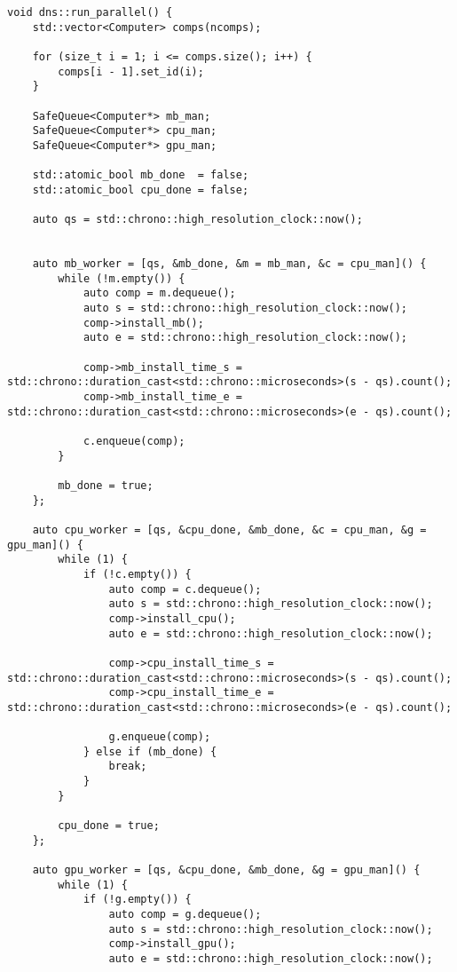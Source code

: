 \begin{lstlisting}[caption=Работа конвейеров, label=list:conveyor, language={}]
void dns::run_parallel() {
    std::vector<Computer> comps(ncomps);

    for (size_t i = 1; i <= comps.size(); i++) {
        comps[i - 1].set_id(i);
    }

    SafeQueue<Computer*> mb_man;
    SafeQueue<Computer*> cpu_man;
    SafeQueue<Computer*> gpu_man;

    std::atomic_bool mb_done  = false;
    std::atomic_bool cpu_done = false;

    auto qs = std::chrono::high_resolution_clock::now();


    auto mb_worker = [qs, &mb_done, &m = mb_man, &c = cpu_man]() {
        while (!m.empty()) {
            auto comp = m.dequeue();
            auto s = std::chrono::high_resolution_clock::now();
            comp->install_mb();
            auto e = std::chrono::high_resolution_clock::now();

            comp->mb_install_time_s = std::chrono::duration_cast<std::chrono::microseconds>(s - qs).count();
            comp->mb_install_time_e = std::chrono::duration_cast<std::chrono::microseconds>(e - qs).count();

            c.enqueue(comp);
        }

        mb_done = true;   
    };

    auto cpu_worker = [qs, &cpu_done, &mb_done, &c = cpu_man, &g = gpu_man]() {
        while (1) {
            if (!c.empty()) {
                auto comp = c.dequeue();
                auto s = std::chrono::high_resolution_clock::now();
                comp->install_cpu();
                auto e = std::chrono::high_resolution_clock::now();

                comp->cpu_install_time_s = std::chrono::duration_cast<std::chrono::microseconds>(s - qs).count();
                comp->cpu_install_time_e = std::chrono::duration_cast<std::chrono::microseconds>(e - qs).count();

                g.enqueue(comp);
            } else if (mb_done) {
                break;
            }
        }

        cpu_done = true;
    };

    auto gpu_worker = [qs, &cpu_done, &mb_done, &g = gpu_man]() {
        while (1) {
            if (!g.empty()) {
                auto comp = g.dequeue();
                auto s = std::chrono::high_resolution_clock::now();
                comp->install_gpu();
                auto e = std::chrono::high_resolution_clock::now();


\end{lstlisting}
